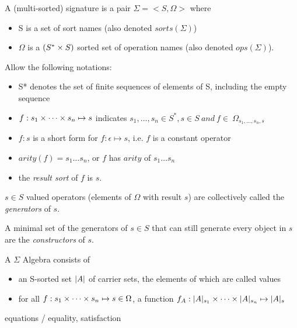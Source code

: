 {\begin{df}[Signature]
A (multi-sorted) signature is a pair $\Sigma = <S,\Omega>$ where
\begin{itemize}
\item S is a set of sort names (also denoted $sorts(\Sigma)$)
\item $\Omega$ is a $(S^* \times S)$ sorted set of operation names (also denoted $ops(\Sigma)$).
\end{itemize}
Allow the following notations:
\begin{itemize}
\item S* denotes the set of finite sequences of elements of S, including the empty sequence
\item $f: s_1 \times \cdots \times s_n \mapsto s$ indicates 
$s_1,\ldots,s_n \in S^*, s \in S\ and\ f \in \ \Omega_{s_1,\ldots,s_n,s}$
\item $f:s$ is a short form for $f:\epsilon \mapsto s$, i.e. $f$ is a constant operator
\item $arity(f) = s_1\ldots s_n$, or $f$ has $arity$ of $s_1\ldots s_n$
\item the \emph{result sort} of $f$ is $s$.
\end{itemize}

\end{df}

\begin{df}[Generators]
$s \in S$ valued operators (elements of $\Omega$ with result $s$) are 
collectively called the \emph{generators} of $s$.
\end{df}

\begin{df}[Constructors]
A minimal set of the generators of $s \in S$
that can still generate every object in $s$ are the \emph{constructors} of $s$.
\end{df}

\begin{df}
A $\Sigma$ Algebra consists of
\begin{itemize}
\item an S-sorted set $\lvert A\rvert$ of carrier sets, the elements of which are called values
\item for all $f: s_1 \times \cdots \times s_n \mapsto s \in \Omega$, a function
$f_A: \lvert A\rvert_{s_1} \times \cdots \times  \lvert A\rvert_{s_n} \mapsto \lvert A\rvert_s$ 
\end{itemize}
\end{df}

equations / equality, satisfaction

}
